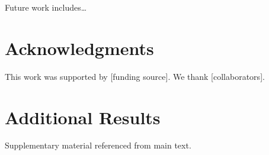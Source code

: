\documentclass[11pt,a4paper]{article}
\theoremstyle{definition}
\theoremstyle{remark}
\begin{document}
Future work includes\ldots

\section*{Acknowledgments}

This work was supported by [funding source]. We thank [collaborators].

\printbibliography

\appendix
\section{Additional Results}
\label{app:additional}

Supplementary material referenced from main text.
\end{document}
